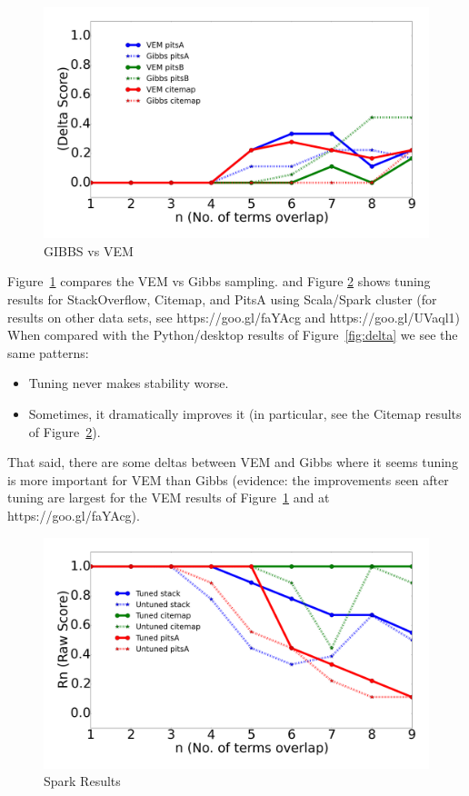 \documentclass[10pt,conference]{IEEEtran}
\newcommand{\bi}{\begin{itemize}}
\newcommand{\ei}{\end{itemize}}
\theoremstyle{break}
\begin{document}
\begin{figure}[!htbp]
  \captionsetup{justification=centering}
  \includegraphics[width=\linewidth]{./fig/gibbs_vem1.png}
  \caption{GIBBS vs VEM}
  \label{gibbs_vem}
\end{figure}

  Figure~\ref{gibbs_vem} compares the  VEM vs Gibbs sampling.
  and Figure
   \ref{python_spark} shows tuning results for StackOverflow, Citemap, and PitsA 
   using Scala/Spark cluster (for results on other data sets, see https://goo.gl/faYAcg
   and https://goo.gl/UVaql1)
   When compared with the Python/desktop results of
   Figure~\ref{fig:delta} we see the same patterns:
   \bi
 \item Tuning never makes stability worse.
 \item Sometimes, it dramatically improves it (in particular, see the Citemap results
   of  Figure~\ref{python_spark}).
   \ei
   That said, there are some deltas between VEM and Gibbs where it seems tuning
   is more important for VEM than Gibbs (evidence: the improvements seen after
   tuning are largest for the  VEM results of  Figure~\ref{gibbs_vem} and at  https://goo.gl/faYAcg).

   
\begin{figure}[!htbp]
  \captionsetup{justification=centering}
  \includegraphics[width=\linewidth]{./fig/spark.png}
  \caption{Spark Results}
  \label{python_spark}
\end{figure}
\end{document}
